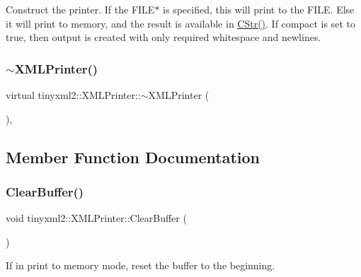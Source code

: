 Construct the printer. If the F\+I\+L\+E$\ast$ is specified, this will print to the F\+I\+LE. Else it will print to memory, and the result is available in \mbox{\hyperlink{classtinyxml2_1_1_x_m_l_printer_a180671d73844f159f2d4aafbc11d106e}{C\+Str()}}. If \textquotesingle{}compact\textquotesingle{} is set to true, then output is created with only required whitespace and newlines. \mbox{\label{classtinyxml2_1_1_x_m_l_printer_af4caefa48ea6436898fb1807de8d14c0}} 
\subsubsection{\texorpdfstring{$\sim$\+X\+M\+L\+Printer()}{~XMLPrinter()}}
{\footnotesize\ttfamily virtual tinyxml2\+::\+X\+M\+L\+Printer\+::$\sim$\+X\+M\+L\+Printer (\begin{DoxyParamCaption}{ }\end{DoxyParamCaption})\hspace{0.3cm}{\ttfamily [inline]}, {\ttfamily [virtual]}}



\subsection{Member Function Documentation}
\mbox{\label{classtinyxml2_1_1_x_m_l_printer_a216157765b7267bf389975b1cbf9a909}} 
\subsubsection{\texorpdfstring{Clear\+Buffer()}{ClearBuffer()}}
{\footnotesize\ttfamily void tinyxml2\+::\+X\+M\+L\+Printer\+::\+Clear\+Buffer (\begin{DoxyParamCaption}{ }\end{DoxyParamCaption})\hspace{0.3cm}{\ttfamily [inline]}}

If in print to memory mode, reset the buffer to the beginning. \mbox{\label{classtinyxml2_1_1_x_m_l_printer_af1fb439e5d800999646f333fa2f0699a}} 
